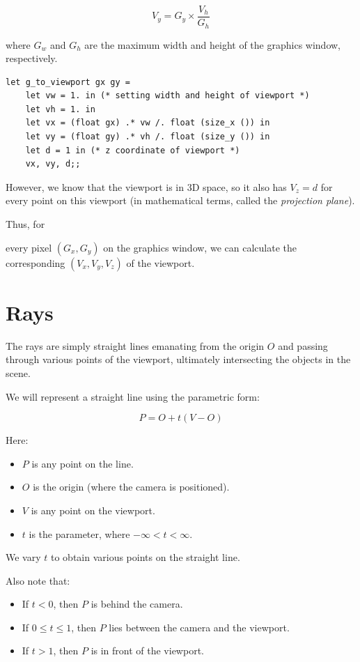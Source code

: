 \documentclass{article}
\begin{document}
$$V_y = G_y \times \frac{V_h}{G_h}$$

where $G_w$ and $G_h$ are the maximum width and height of the graphics window, respectively.

\begin{verbatim}
let g_to_viewport gx gy =
    let vw = 1. in (* setting width and height of viewport *)
    let vh = 1. in
    let vx = (float gx) .* vw /. float (size_x ()) in 
    let vy = (float gy) .* vh /. float (size_y ()) in 
    let d = 1 in (* z coordinate of viewport *)
    vx, vy, d;;
\end{verbatim}

However, we know that the viewport is in 3D space, so it also has $V_z = d$ for every point on this viewport (in mathematical terms, called the \textit{projection plane}).

Thus, for

every pixel $(G_x, G_y)$ on the graphics window, we can calculate the corresponding $(V_x, V_y, V_z)$ of the viewport.

\section{Rays}

The rays are simply straight lines emanating from the origin $O$ and passing through various points of the viewport, ultimately intersecting the objects in the scene.

We will represent a straight line using the parametric form:

$$P = O + t(V - O)$$

Here:
\begin{itemize}
    \item $P$ is any point on the line.
    \item $O$ is the origin (where the camera is positioned).
    \item $V$ is any point on the viewport.
    \item $t$ is the parameter, where $-\infty < t < \infty$.
\end{itemize}

We vary $t$ to obtain various points on the straight line.

Also note that:
\begin{itemize}
    \item If $t < 0$, then $P$ is behind the camera.
    \item If $0 \leq t \leq 1$, then $P$ lies between the camera and the viewport.
    \item If $t > 1$, then $P$ is in front of the viewport.
\end{itemize}
\end{document}
